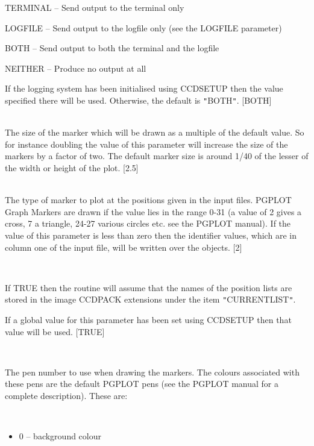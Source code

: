\documentclass[twoside,11pt]{article}
\newcommand{\htmlref}[2]{#1}
\renewcommand{\_}{\texttt{\symbol{95}}}
\newcommand{\qt}[1]{{\tt "}#1{\tt "}}
\newcommand{\xroutine}[1]{\htmlref{{\sc #1}}{#1}}
\newcommand{\sstsubsection}[1]{ \item[{#1}] \mbox{} \\}
\newcommand{\sstitemlist}[1]{
  \mbox{} \\
  \vspace{-3.5ex}
  \begin{itemize}
     #1
  \end{itemize}
}
\newcommand{\sstitem}{\item}
\newcommand{\sstsubsection}[1]{\item[{#1}]}
\newcommand{\sstitemlist}[1]{
      \begin{itemize}
         #1
      \end{itemize}
      \\
   }
\newcommand{\sstitem}{\item}
\begin{document}
{{{{            \sstitem
               TERMINAL  -- Send output to the terminal only

            \sstitem
               LOGFILE   -- Send output to the logfile only (see the
                               LOGFILE parameter)

            \sstitem
               BOTH      -- Send output to both the terminal and the
                               logfile

            \sstitem
               NEITHER   -- Produce no output at all

         }
         If the logging system has been initialised using \xroutine{CCDSETUP}
         then the value specified there will be used. Otherwise, the
         default is \qt{BOTH}.
         [BOTH]
      }
      \sstsubsection{
         MSIZE = \_REAL (Read)
      } {
         The size of the marker which will be drawn as a multiple of
         the default value. So for instance doubling the value of this
         parameter will increase the size of the markers by a factor of
         two. The default marker size is around 1/40 of the lesser of
         the width or height of the plot.
         [2.5]
      }
      \sstsubsection{
         MTYPE = \_INTEGER (Read)
      } {
         The type of marker to plot at the positions given in the input
         files. PGPLOT Graph Markers are drawn if the value lies in the
         range 0-31 (a value of 2 gives a cross, 7 a triangle, 24-27
         various circles etc. see the PGPLOT manual). If the value of
         this parameter is less than zero then the identifier values,
         which are in column one of the input file, will be written over
         the objects.
         [2]
      }
      \sstsubsection{
         NDFNAMES = \_LOGICAL (Read)
      } {
         If TRUE then the routine will assume that the names of the
         position lists are stored in the image CCDPACK extensions under
         the item \qt{CURRENT\_LIST}.

         If a global value for this parameter has been set using
         \xroutine{CCDSETUP} then that value will be used.
         [TRUE]
      }
      \sstsubsection{
         PALNUM = \_INTEGER (Read)
      } {
         The pen number to use when drawing the markers.  The colours
         associated with these pens are the default PGPLOT pens (see
         the PGPLOT manual for a complete description). These are:
         \sstitemlist{

            \sstitem
               0 -- background colour

}}}}
\end{document}
